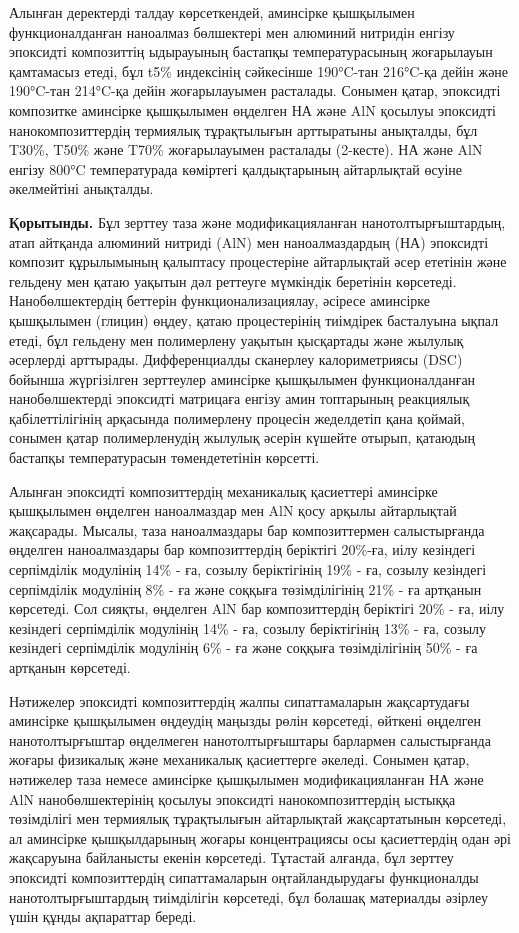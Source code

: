 \begin{multicols}{2}
Алынған деректерді талдау көрсеткендей, аминсірке қышқылымен
функционалданған наноалмаз бөлшектері мен алюминий нитридін енгізу
эпоксидті композиттің ыдырауының бастапқы температурасының жоғарылауын
қамтамасыз етеді, бұл t5\% индексінің сәйкесінше 190°C-тан 216°C-қа
дейін және 190°C-тан 214°C-қа дейін жоғарылауымен расталады. Сонымен
қатар, эпоксидті композитке аминсірке қышқылымен өңделген НА және AlN
қосылуы эпоксидті нанокомпозиттердің термиялық тұрақтылығын арттыратыны
анықталды, бұл T30\%, T50\% және T70\% жоғарылауымен расталады
(2-кесте). НА және AlN енгізу 800°C температурада көміртегі
қалдықтарының айтарлықтай өсуіне әкелмейтіні анықталды.

{\bfseries Қорытынды.} Бұл зерттеу таза және модификацияланған
нанотолтырғыштардың, атап айтқанда алюминий нитриді (AlN) мен
наноалмаздардың (НА) эпоксидті композит құрылымының қалыптасу
процестеріне айтарлықтай әсер ететінін және гельдену мен қатаю уақытын
дәл реттеуге мүмкіндік беретінін көрсетеді. Нанобөлшектердің беттерін
функционализациялау, әсіресе аминсірке қышқылымен (глицин) өңдеу, қатаю
процестерінің тиімдірек басталуына ықпал етеді, бұл гельдену мен
полимерлену уақытын қысқартады және жылулық әсерлерді арттырады.
Дифференциалды сканерлеу калориметриясы (DSC) бойынша жүргізілген
зерттеулер аминсірке қышқылымен функционалданған нанобөлшектерді
эпоксидті матрицаға енгізу амин топтарының реакциялық қабілеттілігінің
арқасында полимерлену процесін жеделдетіп қана қоймай, сонымен қатар
полимерленудің жылулық әсерін күшейте отырып, қатаюдың бастапқы
температурасын төмендететінін көрсетті.

Алынған эпоксидті композиттердің механикалық қасиеттері аминсірке
қышқылымен өңделген наноалмаздар мен AlN қосу арқылы айтарлықтай
жақсарады. Мысалы, таза наноалмаздары бар композиттермен салыстырғанда
өңделген наноалмаздары бар композиттердің беріктігі 20\%-ға, иілу
кезіндегі серпімділік модулінің 14\% - ға, созылу беріктігінің 19\% -
ға, созылу кезіндегі серпімділік модулінің 8\% - ға және соққыға
төзімділігінің 21\% - ға артқанын көрсетеді. Сол сияқты, өңделген AlN
бар композиттердің беріктігі 20\% - ға, иілу кезіндегі серпімділік
модулінің 14\% - ға, созылу беріктігінің 13\% - ға, созылу кезіндегі
серпімділік модулінің 6\% - ға және соққыға төзімділігінің 50\% - ға
артқанын көрсетеді.

Нәтижелер эпоксидті композиттердің жалпы сипаттамаларын жақсартудағы
аминсірке қышқылымен өңдеудің маңызды рөлін көрсетеді, өйткені өңделген
нанотолтырғыштар өңделмеген нанотолтырғыштары барлармен салыстырғанда
жоғары физикалық және механикалық қасиеттерге әкеледі. Сонымен қатар,
нәтижелер таза немесе аминсірке қышқылымен модификацияланған НА және AlN
нанобөлшектерінің қосылуы эпоксидті нанокомпозиттердің ыстыққа
төзімділігі мен термиялық тұрақтылығын айтарлықтай жақсартатынын
көрсетеді, ал аминсірке қышқылдарының жоғары концентрациясы осы
қасиеттердің одан әрі жақсаруына байланысты екенін көрсетеді. Тұтастай
алғанда, бұл зерттеу эпоксидті композиттердің сипаттамаларын
оңтайландырудағы функционалды нанотолтырғыштардың тиімділігін көрсетеді,
бұл болашақ материалды әзірлеу үшін құнды ақпараттар береді.


\end{multicols}
